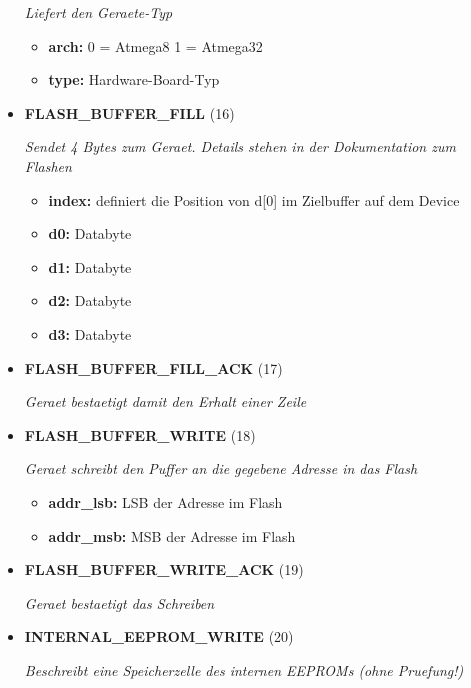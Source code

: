 \begin{itemize}
\textit{Liefert den Geraete-Typ}

\small
\begin{itemize}
		
\item \textbf{arch:} 0 = Atmega8 1 = Atmega32
\item \textbf{type:} Hardware-Board-Typ
\end{itemize}
\normalsize
	
\item \textbf{FLASH\_BUFFER\_FILL} (16)

\textit{Sendet 4 Bytes zum Geraet. Details stehen in der Dokumentation zum Flashen}

\small
\begin{itemize}
		
\item \textbf{index:} definiert die Position von d[0] im Zielbuffer auf dem Device
\item \textbf{d0:} Databyte
\item \textbf{d1:} Databyte
\item \textbf{d2:} Databyte
\item \textbf{d3:} Databyte
\end{itemize}
\normalsize
	
\item \textbf{FLASH\_BUFFER\_FILL\_ACK} (17)

\textit{Geraet bestaetigt damit den Erhalt einer Zeile}

\item \textbf{FLASH\_BUFFER\_WRITE} (18)

\textit{Geraet schreibt den Puffer an die gegebene Adresse in das Flash}

\small
\begin{itemize}
		
\item \textbf{addr\_lsb:} LSB der Adresse im Flash
\item \textbf{addr\_msb:} MSB der Adresse im Flash
\end{itemize}
\normalsize
	
\item \textbf{FLASH\_BUFFER\_WRITE\_ACK} (19)

\textit{Geraet bestaetigt das Schreiben}

\item \textbf{INTERNAL\_EEPROM\_WRITE} (20)

\textit{Beschreibt eine Speicherzelle des internen EEPROMs (ohne Pruefung!)}


\end{itemize}
